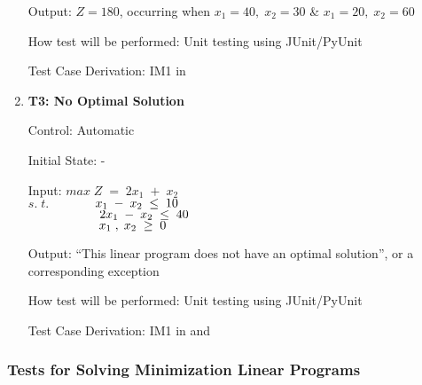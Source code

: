 \documentclass[12pt, titlepage]{article}
\begin{document}
\begin{enumerate}
	Output: $Z = 180$, occurring when $x_1=40,\;x_2=30$ \& $x_1=20,\;x_2=60$
	
	How test will be performed: Unit testing using JUnit/PyUnit
	
	Test Case Derivation: IM1 in \cite{losms-ca}

	\item{\textbf{T3: No Optimal Solution}}
	
	Control: Automatic 
	
	Initial State: -
	
	Input: $max\;Z\;=\;2x_1\;+\;x_2$\\
	$s.\;t.$$\hspace*{1.3cm} x_1\;-\;x_2\; \leq \;10$\\
	$\hspace*{2cm} 2x_1\;-\;x_2\; \leq \;40$\\
	$\hspace*{2cm} x_1\;,\;x_2\; \geq \;0$
	
	Output: ``This linear program does not have an optimal solution'', or a 
	corresponding exception
	
	How test will be performed: Unit testing using JUnit/PyUnit
	
	Test Case Derivation: IM1 in \cite{losms-ca} and 
	\cite{simplex-special-situations}
\end{enumerate}

\subsubsection{Tests for Solving Minimization Linear Programs}
\end{document}
